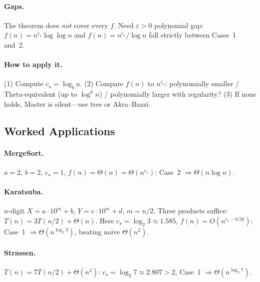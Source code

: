 \paragraph{Gaps.} The theorem does \emph{not} cover every $f$. Need $\varepsilon>0$ polynomial gap: $f(n)=n^{c_{\star}}\log\log n$ and $f(n)=n^{c_{\star}}/\log n$ fall strictly between Cases~1 and~2.

\noindent{}
\paragraph{How to apply it.} (1) Compute $c_{\star}=\log_{b}a$. (2) Compare $f(n)$ to $n^{c_{\star}}$: polynomially smaller / Theta-equivalent (up to $\log^{k}n$) / polynomially larger with regularity? (3) If none holds, Master is silent---use tree or Akra--Bazzi.

\subsection{Worked Applications}
\paragraph{MergeSort.} $a=2$, $b=2$, $c_{\star}=1$, $f(n)=\Theta(n)=\Theta(n^{c_{\star}})$: Case~2 $\Rightarrow\Theta(n\log n)$.
\paragraph{Karatsuba.}\label{sec:karatsuba} $n$-digit $X=a\cdot10^{m}+b$, $Y=c\cdot10^{m}+d$, $m=n/2$. Three products suffice: $T(n)=3T(n/2)+\Theta(n)$. Here $c_{\star}=\log_{2}3\approx1.585$, $f(n)=O(n^{c_{\star}-0.58})$: Case~1 $\Rightarrow\Theta(n^{\log_{2}3})$, beating naive $\Theta(n^{2})$.
\paragraph{Strassen.} $T(n)=7T(n/2)+\Theta(n^{2})$: $c_{\star}=\log_{2}7\approx2.807>2$, Case~1 $\Rightarrow\Theta(n^{\log_{2}7})$.
